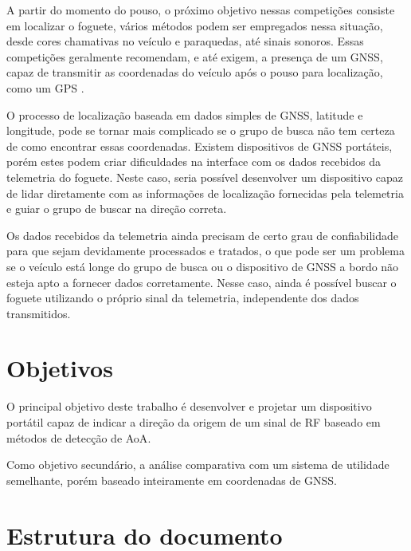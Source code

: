 A partir do momento do pouso, o próximo objetivo nessas competições consiste em localizar o foguete, vários métodos podem ser empregados nessa situação, desde cores chamativas no veículo e paraquedas, até sinais sonoros.
Essas competições geralmente recomendam, e até exigem, a presença de um \ac{GNSS}, capaz de transmitir as coordenadas do veículo após o pouso para localização, como um \ac{GPS} \cite{irec}.

O processo de localização baseada em dados simples de \ac{GNSS}, latitude e longitude, pode se tornar mais complicado se o grupo de busca não tem certeza de como encontrar essas coordenadas.
Existem dispositivos de \ac{GNSS} portáteis, porém estes podem criar dificuldades na interface com os dados recebidos da telemetria do foguete.
Neste caso, seria possível desenvolver um dispositivo capaz de lidar diretamente com as informações de localização fornecidas pela telemetria e guiar o grupo de buscar na direção correta.

Os dados recebidos da telemetria ainda precisam de certo grau de confiabilidade para que sejam devidamente processados e tratados, o que pode ser um problema se o veículo está longe do grupo de busca ou o dispositivo de \ac{GNSS} a bordo não esteja apto a fornecer dados corretamente.
Nesse caso, ainda é possível buscar o foguete utilizando o próprio sinal da telemetria, independente dos dados transmitidos.







\section{Objetivos}

O principal objetivo deste trabalho é desenvolver e projetar um dispositivo portátil capaz de indicar a direção da origem de um sinal de \ac{RF} baseado em métodos de detecção de \ac{AoA}.

Como objetivo secundário, a análise comparativa com um sistema de utilidade semelhante, porém baseado inteiramente em coordenadas de \ac{GNSS}.

\section{Estrutura do documento}

